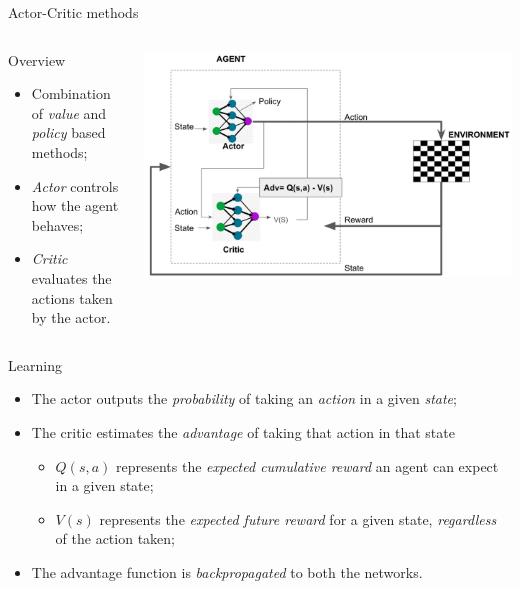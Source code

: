 \documentclass[presentation]{beamer}\mode<presentation>{\usetheme{AMSBolognaFC}}
\begin{document}
\begin{frame}[allowframebreaks]{Actor-Critic methods} 
\begin{columns}
	\begin{column}{0.55\textwidth}
		\begin{block}{Overview}
			\begin{itemize}
				\item Combination of \emph{value} and \emph{policy} based methods;
				\item \emph{Actor} controls how the agent behaves;
				\item \emph{Critic} evaluates the actions taken by the actor. 
			\end{itemize}
		\end{block}
	\end{column}
	\begin{column}{0.45\textwidth}
	\includegraphics[width=\textwidth]{img/ac_method.pdf}
	\end{column}
\end{columns}
	
\centering

\begin{alertblock}{Learning}
	 	\begin{itemize}
	 		\item The actor outputs the \emph{probability} of taking an \emph{action} in a given \emph{state};
	 		\item The critic estimates the \emph{advantage} of taking that action in that state
	 		\begin{itemize}
				\item $Q(s,a)$ represents the \emph{expected cumulative reward} an agent can expect in a given state;
				\item $V(s)$ represents the \emph{expected future reward} for a given state, \emph{regardless} of the action taken;
			\end{itemize}
	 		\item The advantage function is \emph{backpropagated} to both the networks.
	 	\end{itemize}
\end{alertblock}


\end{frame}
\end{document}
